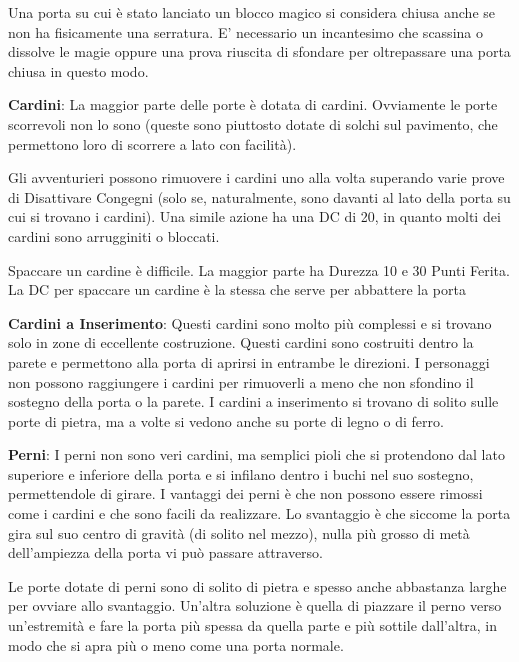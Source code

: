 \begin{multicols}{2}
Una porta su cui è stato lanciato un blocco magico si considera chiusa anche se non ha fisicamente una serratura. E' necessario un incantesimo che scassina o dissolve le magie oppure una prova riuscita di sfondare per oltrepassare una porta chiusa in questo modo.

\textbf{Cardini}: La maggior parte delle porte è dotata di cardini. Ovviamente le porte scorrevoli non lo sono (queste sono piuttosto dotate di solchi sul pavimento, che permettono loro di scorrere a lato con facilità).

Gli avventurieri possono rimuovere i cardini uno alla volta superando varie prove di Disattivare Congegni (solo se, naturalmente, sono davanti al lato della porta su cui si trovano i cardini). Una simile azione ha una DC di 20, in quanto molti dei cardini sono arrugginiti o bloccati.

Spaccare un cardine è difficile. La maggior parte ha Durezza 10 e 30 Punti Ferita. La DC per spaccare un cardine è la stessa che serve per abbattere la porta


\textbf{Cardini a Inserimento}: Questi cardini sono molto più complessi e si trovano solo in zone di eccellente costruzione. Questi cardini sono costruiti dentro la parete e permettono alla porta di aprirsi in entrambe le direzioni. I personaggi non possono raggiungere i cardini per rimuoverli a meno che non sfondino il sostegno della porta o la parete. I cardini a inserimento si trovano di solito sulle porte di pietra, ma a volte si vedono anche su porte di legno o di ferro.

\textbf{Perni}: I perni non sono veri cardini, ma semplici pioli che si protendono dal lato superiore e inferiore della porta e si infilano dentro i buchi nel suo sostegno, permettendole di girare. I vantaggi dei perni è che non possono essere rimossi come i cardini e che sono facili da realizzare. Lo svantaggio è che siccome la porta gira sul suo centro di gravità (di solito nel mezzo), nulla più grosso di metà dell'ampiezza della porta vi può passare attraverso.

Le porte dotate di perni sono di solito di pietra e spesso anche abbastanza larghe per ovviare allo svantaggio. Un'altra soluzione è quella di piazzare il perno verso un'estremità e fare la porta più spessa da quella parte e più sottile dall'altra, in modo che si apra più o meno come una porta normale.


\end{multicols}
